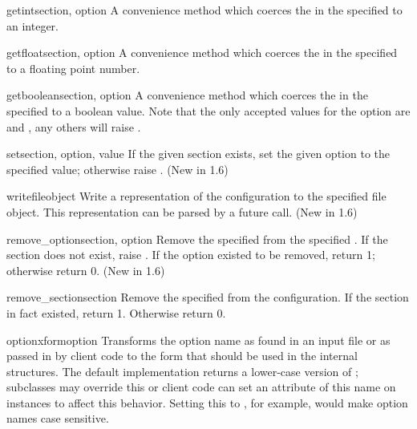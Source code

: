 \begin{methoddesc}{getint}{section, option}
A convenience method which coerces the  in the specified
 to an integer.
\end{methoddesc}

\begin{methoddesc}{getfloat}{section, option}
A convenience method which coerces the  in the specified
 to a floating point number.
\end{methoddesc}

\begin{methoddesc}{getboolean}{section, option}
A convenience method which coerces the  in the specified
 to a boolean value.  Note that the only accepted values
for the option are  and , any others will raise
.
\end{methoddesc}

\begin{methoddesc}{set}{section, option, value}
If the given section exists, set the given option to the specified value;
otherwise raise . (New in 1.6)
\end{methoddesc}

\begin{methoddesc}{write}{fileobject}
Write a representation of the configuration to the specified file
object.  This representation can be parsed by a future 
call. (New in 1.6)
\end{methoddesc}

\begin{methoddesc}{remove_option}{section, option}
Remove the specified  from the specified .
If the section does not exist, raise . 
If the option existed to be removed, return 1; otherwise return 0.
(New in 1.6)
\end{methoddesc}

\begin{methoddesc}{remove_section}{section}
Remove the specified  from the configuration.
If the section in fact existed, return 1.  Otherwise return 0.
\end{methoddesc}

\begin{methoddesc}{optionxform}{option}
Transforms the option name  as found in an input file or
as passed in by  client code to the form that should be used in the
internal structures.  The default implementation returns a lower-case
version of ; subclasses may override this or client code
can set an attribute of this name on instances to affect this
behavior.  Setting this to , for example, would make
option names case sensitive.
\end{methoddesc}

